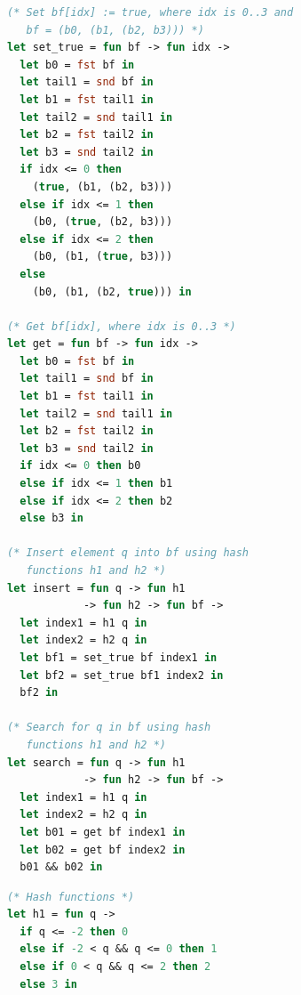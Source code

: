 \begin{figure}[t]
    \centering
    \begin{minipage}[t]{0.46\textwidth}
    \vspace{0pt}
    \begin{lstlisting}[aboveskip=0.4em,belowskip=0.4em,
      language=OCaml,
      escapechar=!,
      numbers=right,
      stepnumber=1,
      numberstyle=\color{gray}\scriptsize,
      numbersep=7pt,
      basicstyle=\ttfamily\footnotesize,
      commentstyle=\color{ForestGreen}\itshape]
(* Set bf[idx] := true, where idx is 0..3 and
   bf = (b0, (b1, (b2, b3))) *)
let set_true = fun bf -> fun idx ->
  let b0 = fst bf in
  let tail1 = snd bf in
  let b1 = fst tail1 in
  let tail2 = snd tail1 in
  let b2 = fst tail2 in
  let b3 = snd tail2 in
  if idx <= 0 then
    (true, (b1, (b2, b3)))
  else if idx <= 1 then
    (b0, (true, (b2, b3)))
  else if idx <= 2 then
    (b0, (b1, (true, b3)))
  else
    (b0, (b1, (b2, true))) in

(* Get bf[idx], where idx is 0..3 *)
let get = fun bf -> fun idx ->
  let b0 = fst bf in
  let tail1 = snd bf in
  let b1 = fst tail1 in
  let tail2 = snd tail1 in
  let b2 = fst tail2 in
  let b3 = snd tail2 in
  if idx <= 0 then b0
  else if idx <= 1 then b1
  else if idx <= 2 then b2
  else b3 in

(* Insert element q into bf using hash
   functions h1 and h2 *)
let insert = fun q -> fun h1 
            -> fun h2 -> fun bf ->
  let index1 = h1 q in
  let index2 = h2 q in
  let bf1 = set_true bf index1 in
  let bf2 = set_true bf1 index2 in
  bf2 in

(* Search for q in bf using hash
   functions h1 and h2 *)
let search = fun q -> fun h1 
            -> fun h2 -> fun bf ->
  let index1 = h1 q in
  let index2 = h2 q in
  let b01 = get bf index1 in
  let b02 = get bf index2 in
  b01 && b02 in
    \end{lstlisting}
    \end{minipage}
    \hfill
    \hspace{-4pt}%
    \begin{minipage}[t]{0.46\textwidth}
    \vspace{0pt}
    \begin{lstlisting}[aboveskip=0.4em,belowskip=0.4em,
      language=OCaml,
      escapechar=!,
      numbers=right,
      stepnumber=1,
      firstnumber=last,
      numberstyle=\color{gray}\scriptsize,
      numbersep=7pt,
      basicstyle=\ttfamily\footnotesize,
      commentstyle=\color{ForestGreen}\itshape]
(* Hash functions *)
let h1 = fun q ->
  if q <= -2 then 0
  else if -2 < q && q <= 0 then 1
  else if 0 < q && q <= 2 then 2
  else 3 in


\end{lstlisting}
\end{minipage}
\end{figure}
